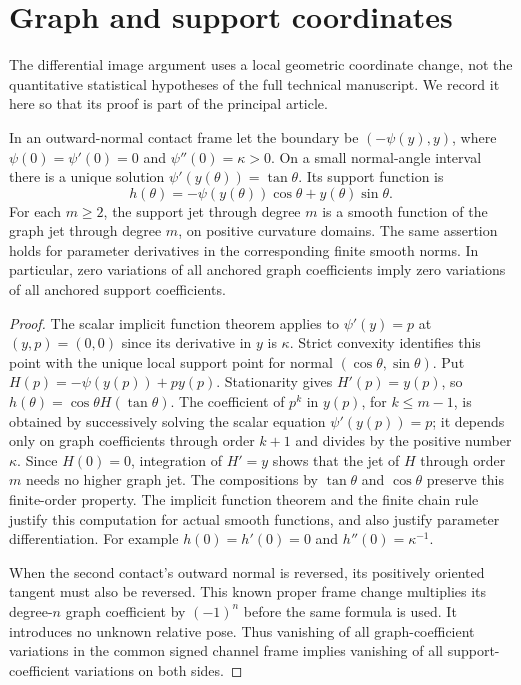 \section{Graph and support coordinates}
\label{sec:v56-graph-support}

The differential image argument uses a local geometric coordinate change,
not the quantitative statistical hypotheses of the full technical
manuscript.  We record it here so that its proof is part of the principal
article.

\begin{lemma}
\label{lem:v56-graph-support}
In an outward-normal contact frame let the boundary be $(-\psi(y),y)$,
where $\psi(0)=\psi'(0)=0$ and $\psi''(0)=\kappa>0$.
On a small normal-angle interval there is a unique solution
$\psi'(y(\theta))=\tan\theta$.  Its support function is
\begin{equation}\label{eq:v46-graph-support}
 h(\theta)=-\psi(y(\theta))\cos\theta+y(\theta)\sin\theta.
\end{equation}
For each $m\ge2$, the support jet through degree $m$ is a smooth function
of the graph jet through degree $m$, on positive curvature domains.
The same assertion holds for parameter derivatives in the corresponding
finite smooth norms.  In particular, zero variations of all anchored
graph coefficients imply zero variations of all anchored support
coefficients.
\end{lemma}

\begin{proof}
The scalar implicit function theorem applies to $\psi'(y)=p$ at
$(y,p)=(0,0)$ since its derivative in $y$ is $\kappa$.  Strict convexity
identifies this point with the unique local support point for normal
$(\cos\theta,\sin\theta)$.  Put
$H(p)=-\psi(y(p))+py(p)$.  Stationarity gives $H'(p)=y(p)$, so
$h(\theta)=\cos\theta H(\tan\theta)$.
The coefficient of $p^k$ in $y(p)$, for $k\le m-1$, is obtained by
successively solving the scalar equation $\psi'(y(p))=p$; it depends
only on graph coefficients through order $k+1$ and divides by the
positive number $\kappa$.  Since $H(0)=0$, integration of $H'=y$
shows that the jet of $H$ through order $m$ needs no higher graph jet.
The compositions by $\tan\theta$ and $\cos\theta$ preserve this
finite-order property.  The implicit function theorem and the finite
chain rule justify this computation for actual smooth functions, and
also justify parameter differentiation.  For example $h(0)=h'(0)=0$
and $h''(0)=\kappa^{-1}$.

When the second contact's outward normal is reversed, its positively
oriented tangent must also be reversed.  This known proper frame change
multiplies its degree-$n$ graph coefficient by $(-1)^n$ before the same
formula is used.  It introduces no unknown relative pose.  Thus vanishing
of all graph-coefficient variations in the common signed channel frame
implies vanishing of all support-coefficient variations on both sides.
\end{proof}
